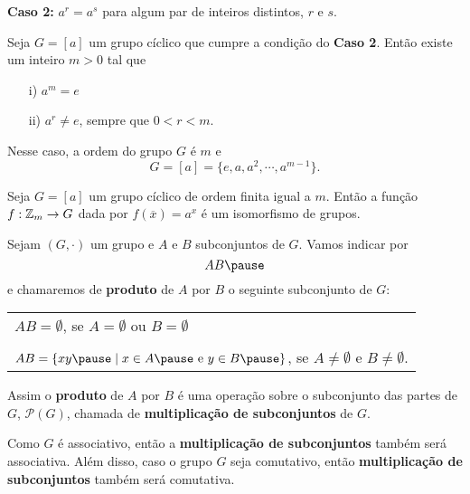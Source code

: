 \documentclass{beamer}
\begin{document}
    \begin{frame}
        \textbf{Caso 2:} $a^r = a^s$ \pause para algum par de inteiros distintos, $r$ e $s$.
    \end{frame}

    \begin{frame}
        \begin{proposicao}
            Seja $G = [a]$ um grupo cíclico que cumpre a condição do \textbf{Caso 2}. \pause Então existe um inteiro $m > 0$ tal que \pause
            \begin{enumerate}
                \item[i)] $a^m = e$ \pause

                \item[ii)] $a^r \ne e$, sempre que $0 < r < m$. \pause
            \end{enumerate}
            Nesse caso, a ordem do grupo $G$ é $m$ \pause e
            \[
                G = [a] = \{e, a, a^2, \cdots, a^{m - 1}\}.
            \]
        \end{proposicao}
    \end{frame}

    \begin{frame}
        \begin{corolario}
            Seja $G = [a]$ um grupo cíclico de ordem finita igual a $m$. \pause Então a função $f : \mathbb{Z}_m \to G$ \pause dada por $f(\overline{x}) = a^x$ \pause é um isomorfismo de grupos.
        \end{corolario}
    \end{frame}

    \begin{frame}
        Sejam $(G, \cdot)$ um grupo \pause e $A$ e $B$ subconjuntos de $G$. \pause Vamos indicar por \pause
        \[
            AB \pause
        \]
        e chamaremos de \textbf{produto} de $A$ por $B$ \pause o seguinte subconjunto de $G$: \pause
        \begin{center}
            \begin{tabular}{l}
                $AB = \emptyset$, \pause se $A = \emptyset$ ou $B = \emptyset$ \pause\\
                \\
                $AB = \{xy \pause \mid x \in A \pause \mbox{ e } y \in B \pause\}$, se  $A \ne \emptyset$ e $B \ne \emptyset$. \pause
            \end{tabular}
        \end{center}

        \vspace{.3cm}

        Assim o \textbf{produto} de $A$ por $B$ \pause é uma operação sobre o subconjunto das partes de $G$, \pause $\mathcal{P}(G)$, chamada de \textbf{multiplicação de subconjuntos} de $G$. \pause

        \vspace{.3cm}

        Como $G$ é associativo, \pause então a \textbf{multiplicação de subconjuntos} também será associativa. \pause Além disso, caso o grupo $G$ seja comutativo, \pause então \textbf{multiplicação de subconjuntos} também será comutativa.
    \end{frame}
\end{document}
